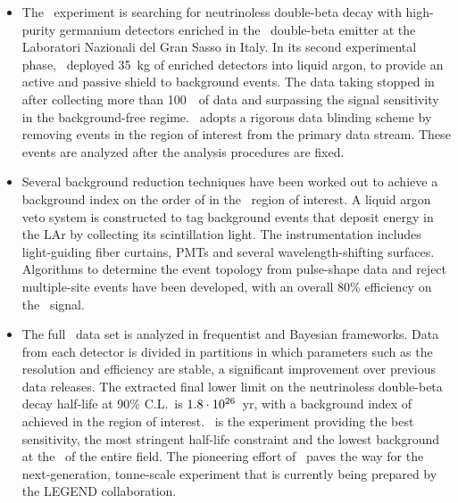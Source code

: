 \chapsummary
\begin{itemize}
  \item The \gerda\ experiment is searching for neutrinoless double-beta decay with
    high-purity germanium detectors enriched in the \gesix\ double-beta emitter at the
    Laboratori Nazionali del Gran Sasso in Italy. In its second experimental phase,
    \gerda\ deployed 35~kg of enriched detectors into liquid argon, to provide an active
    and passive shield to background events. The data taking stopped in  after
    collecting more than 100~\kgyr\ of data and surpassing the  signal
    sensitivity in the background-free regime. \gerda\ adopts a rigorous data blinding
    scheme by removing events in the region of interest from the primary data stream.
    These events are analyzed after the analysis procedures are fixed.
  \item Several background reduction techniques have been worked out to achieve a
    background index on the order of  in the \onbb\ region of interest. A
    liquid argon veto system is constructed to tag background events that deposit energy
    in the LAr by collecting its scintillation light. The instrumentation includes
    light-guiding fiber curtains, PMTs and several wavelength-shifting surfaces.
    Algorithms to determine the event topology from pulse-shape data and reject
    multiple-site events have been developed, with an overall 80\% efficiency on the
    \onbb\ signal.
  \item The full \gerda\ data set is analyzed in frequentist and Bayesian frameworks. Data
    from each detector is divided in partitions in which parameters such as the resolution
    and efficiency are stable, a significant improvement over previous data releases. The
    extracted final lower limit on the neutrinoless double-beta decay half-life at 90\%
    C.L.~is $1.8 \cdot 10^{26}$~yr, with a background index of
    ~ achieved in the region of interest. \gerda\
    is the experiment providing the best sensitivity, the most stringent half-life
    constraint and the lowest background at the \qbb\ of the entire field. The pioneering
    effort of \gerda\ paves the way for the next-generation, tonne-scale experiment that
    is currently being prepared by the LEGEND collaboration.
\end{itemize}

